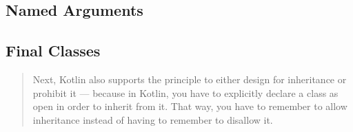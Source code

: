 \documentclass[11pt, a4paper]{report}
\begin{document}
\subsection{Named Arguments}

\subsection{Final Classes}

\begin{quotation}
Next, Kotlin also supports the principle to either design for inheritance or prohibit it — because in Kotlin, you have to explicitly declare a class as open in order to inherit from it. That way, you have to remember to allow inheritance instead of having to remember to disallow it.\cite{kotlin-sommerhoff}
\end{quotation}

\listoffigures
\end{document}
